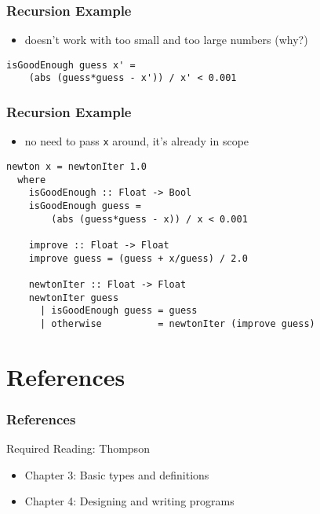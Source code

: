 \documentclass[dvipsnames]{beamer}
\theoremstyle{plain}
\begin{document}
\begin{frame}[fragile]
  \frametitle{Recursion Example}

  \begin{itemize}
    \item doesn't work with too small and too large numbers (why?)
  \end{itemize}

  \pause
  \smallskip
  \begin{lstlisting}
isGoodEnough guess x' =
    (abs (guess*guess - x')) / x' < 0.001
  \end{lstlisting}
\end{frame}

\begin{frame}[fragile]
  \frametitle{Recursion Example}

  \begin{itemize}
    \item no need to pass \lstinline|x| around, it's already in scope
  \end{itemize}

  \pause
  \smallskip
  \begin{lstlisting}
newton x = newtonIter 1.0
  where
    isGoodEnough :: Float -> Bool
    isGoodEnough guess =
        (abs (guess*guess - x)) / x < 0.001

    improve :: Float -> Float
    improve guess = (guess + x/guess) / 2.0

    newtonIter :: Float -> Float
    newtonIter guess
      | isGoodEnough guess = guess
      | otherwise          = newtonIter (improve guess)
  \end{lstlisting}
\end{frame}

\section*{References}

\begin{frame}
  \frametitle{References}

  \begin{block}{Required Reading: Thompson}
    \begin{itemize}
      \item Chapter 3: \alert{Basic types and definitions}
      \item Chapter 4: \alert{Designing and writing programs}
    \end{itemize}
  \end{block}
\end{frame}
\end{document}
